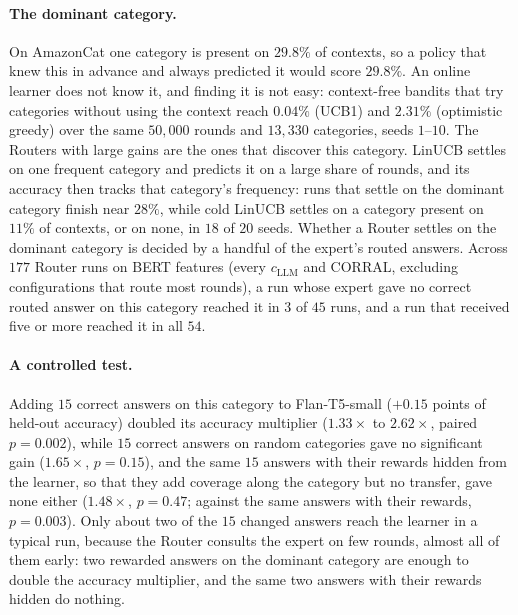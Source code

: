 \documentclass[anon]{alt2027} %
\begin{document}
\paragraph{The dominant category.} On AmazonCat one category is present on
$29.8\%$ of contexts, so a policy that knew this in advance and always
predicted it would score $29.8\%$. An online learner does not know it, and
finding it is not easy: context-free bandits that try categories without
using the context reach $0.04\%$ (UCB1) and $2.31\%$ (optimistic greedy) over
the same $50{,}000$ rounds and $13{,}330$ categories, seeds $1$--$10$. The
Routers with large gains are the ones that discover this category. LinUCB
settles on one frequent category and predicts it on a large share of rounds,
and its accuracy then tracks that category's frequency: runs that settle on
the dominant category finish near $28\%$, while cold LinUCB settles on a
category present on $11\%$ of contexts, or on none, in $18$ of $20$ seeds.
Whether a Router settles on the dominant category is decided by a handful of
the expert's routed answers. Across $177$ Router runs on BERT features (every
$c_{\mathrm{LLM}}$ and CORRAL, excluding configurations that route most rounds), a run whose
expert gave no correct routed answer on this category reached it in $3$ of
$45$ runs, and a run that received five or more reached it in all $54$.

\paragraph{A controlled test.} Adding $15$ correct answers on this category
to Flan-T5-small ($+0.15$ points of held-out accuracy) doubled its accuracy multiplier
($1.33\times$ to $2.62\times$, paired $p=0.002$), while $15$ correct answers on
random categories gave no significant gain ($1.65\times$, $p=0.15$), and the
same $15$ answers with their rewards hidden from the learner, so that they add
coverage along the category but no transfer, gave none either ($1.48\times$,
$p=0.47$; against the same answers with their rewards, $p=0.003$). Only about
two of the $15$ changed answers reach the learner in a typical run, because
the Router consults the expert on few rounds, almost all of them early: two
rewarded answers on the dominant category are enough to double the
accuracy multiplier, and the same two answers with their rewards hidden do nothing.
\end{document}

